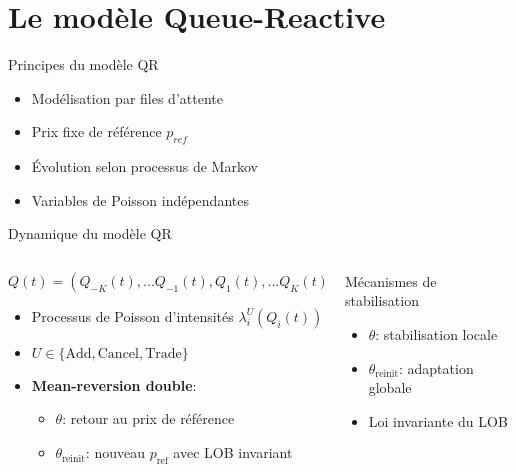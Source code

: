\documentclass[aspectratio=169]{beamer}  %
\begin{document}
\section{Le modèle Queue-Reactive}

\begin{frame}{Principes du modèle QR}
    \begin{itemize}
        \item Modélisation par files d'attente
        \item Prix fixe de référence $p_{ref}$
        \item Évolution selon processus de Markov
        \item Variables de Poisson indépendantes
    \end{itemize}
\end{frame}

\begin{frame}{Dynamique du modèle QR}
    \begin{columns}
        \begin{column}{0.6\textwidth}
            \begin{equation*}
                Q(t) = (Q_{-K}(t),...Q_{-1}(t),Q_{1}(t),...Q_K(t))
            \end{equation*}
            \begin{itemize}
                \item Processus de Poisson d'intensités $\lambda_i^U(Q_i(t))$
                \item $U \in \{\text{Add}, \text{Cancel}, \text{Trade}\}$
                \item \textbf{Mean-reversion double}:
                \begin{itemize}
                    \item $\theta$: retour au prix de référence
                    \item $\theta_{\text{reinit}}$: nouveau $p_{\text{ref}}$ avec LOB invariant
                \end{itemize}
            \end{itemize}
        \end{column}
        \begin{column}{0.4\textwidth}
            \begin{alertblock}{Mécanismes de stabilisation}
                \begin{itemize}
                    \item $\theta$: stabilisation locale
                    \item $\theta_{\text{reinit}}$: adaptation globale
                    \item Loi invariante du LOB
                \end{itemize}
            \end{alertblock}
        \end{column}
    \end{columns}
\end{frame}
\end{document}
